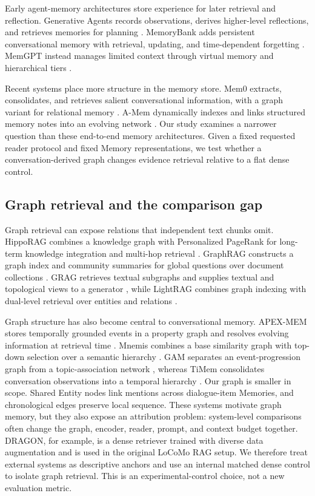 \documentclass[10pt,twocolumn]{article}
\begin{document}
Early agent-memory architectures store experience for later retrieval and
reflection. Generative Agents records observations, derives higher-level
reflections, and retrieves memories for planning
\citep{park2023generative}. MemoryBank adds persistent conversational memory
with retrieval, updating, and time-dependent forgetting
\citep{zhong2024memorybank}. MemGPT instead manages limited context through
virtual memory and hierarchical tiers \citep{packer2023memgpt}.

Recent systems place more structure in the memory store. Mem0 extracts,
consolidates, and retrieves salient conversational information, with a graph
variant for relational memory \citep{chhikara2025mem0}. A-Mem dynamically
indexes and links structured memory notes into an evolving network
\citep{xu2025amem}. Our study examines a narrower question than these
end-to-end memory architectures. Given a fixed requested reader protocol and
fixed Memory representations, we test whether a conversation-derived graph
changes evidence retrieval relative to a flat dense control.

\subsection{Graph retrieval and the comparison gap}

Graph retrieval can expose relations that independent text chunks omit.
HippoRAG combines a knowledge graph with Personalized PageRank for long-term
knowledge integration and multi-hop retrieval
\citep{gutierrez2024hipporag}. GraphRAG constructs a graph index and community
summaries for global questions over document collections
\citep{edge2024graphrag}. GRAG retrieves textual subgraphs and supplies textual
and topological views to a generator \citep{hu2025grag}, while LightRAG
combines graph indexing with dual-level retrieval over entities and relations
\citep{guo2025lightrag}.

Graph structure has also become central to conversational memory. APEX-MEM
stores temporally grounded events in a property graph and resolves evolving
information at retrieval time \citep{banerjee2026apexmem}. Mnemis combines a
base similarity graph with top-down selection over a semantic hierarchy
\citep{tang2026mnemis}. GAM separates an event-progression graph from a
topic-association network \citep{wu2026gam}, whereas TiMem consolidates
conversation observations into a temporal hierarchy
\citep{li2026timem}. Our graph is smaller in scope. Shared Entity nodes link
mentions across dialogue-item Memories, and chronological edges preserve local
sequence. These systems motivate graph memory, but they also expose an
attribution problem: system-level comparisons often change the graph,
encoder, reader, prompt, and context budget together. DRAGON, for example, is
a dense retriever trained with diverse data augmentation
\citep{lin2023dragon} and is used in the original LoCoMo RAG setup. We
therefore treat external systems as descriptive anchors and use an internal
matched dense control to isolate graph retrieval. This is an
experimental-control choice, not a new evaluation metric.
\end{document}
